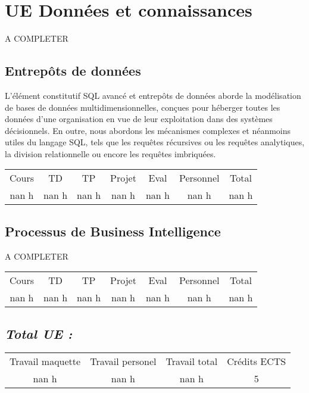 \section{UE Données et connaissances}%
\label{sec:UEDonnesetconnaissances}%
A COMPLETER%
\subsection{Entrepôts de données}%
\label{subsec:Entreptsdedonnes}%

%
L'élément constitutif SQL avancé et entrepôts de données aborde la modélisation de bases de données multidimensionnelles, conçues pour héberger toutes les données d’une organisation en vue de leur exploitation dans des systèmes décisionnels. En outre, nous abordons les mécanismes complexes et néanmoins utiles du langage SQL, tels que les requêtes récursives ou les requêtes analytiques, la division relationnelle ou encore les requêtes imbriquées.%
\begin{longtable}{c c c c c c c}%
\hline%
Cours&TD&TP&Projet&Eval&Personnel&Total\\%
nan h&nan h&nan h&nan h&nan h&nan h&nan h\\%
\hline%
\end{longtable}%
\subsection{Processus de Business Intelligence}%
\label{subsec:ProcessusdeBusinessIntelligence}%

%
A COMPLETER%
\begin{longtable}{c c c c c c c}%
\hline%
Cours&TD&TP&Projet&Eval&Personnel&Total\\%
nan h&nan h&nan h&nan h&nan h&nan h&nan h\\%
\hline%
\end{longtable}%
\subsection{\textit{Total UE :}}%
\label{subsec:textitTotalUE}%

%
\begin{longtable}{c c c c}%
\hline%
Travail maquette&Travail personel&Travail total&Crédits ECTS\\%
nan h&nan h&nan h&5\\%
\hline%
\end{longtable}